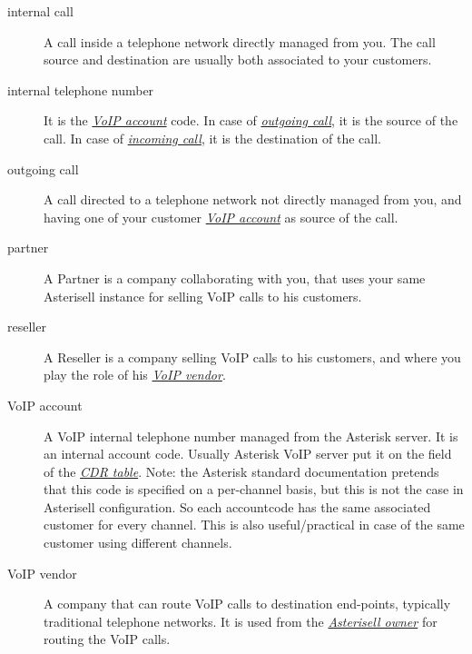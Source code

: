 \documentclass[letterpaper,10pt,english]{sphinxmanual}
\begin{document}
\begin{description}
\item[{internal call}] \leavevmode{}\label{index:term-internal-call}
A call inside a telephone network directly managed from you. The call source and destination are usually both associated to your customers.


\item[{internal telephone number}] \leavevmode{}\label{index:term-internal-telephone-number}
It is the {\hyperref[index:term-voip-account]{\emph{VoIP account}}} code. In case of {\hyperref[index:term-outgoing-call]{\emph{outgoing call}}}, it is the source of the call. In case of {\hyperref[index:term-incoming-call]{\emph{incoming call}}}, it is the destination of the call.


\item[{outgoing call}] \leavevmode{}\label{index:term-outgoing-call}
A call directed to a telephone network not directly managed from you, and having one of your customer {\hyperref[index:term-voip-account]{\emph{VoIP account}}} as source of the call.


\item[{partner}] \leavevmode{}\label{index:term-partner}
A Partner is a company collaborating with you, that uses your same Asterisell instance for selling VoIP calls to his customers.


\item[{reseller}] \leavevmode{}\label{index:term-reseller}
A Reseller is a company selling VoIP calls to his customers, and where you play the role of his {\hyperref[index:term-voip-vendor]{\emph{VoIP vendor}}}.


\item[{VoIP account}] \leavevmode{}\label{index:term-voip-account}
A VoIP internal telephone number managed from the Asterisk server.
It is an internal account code. Usually Asterisk VoIP server put it on the  field of the {\hyperref[index:term-cdr-table]{\emph{CDR table}}}.
Note: the Asterisk standard documentation pretends that this code is specified on a per-channel basis, but this is not the case in Asterisell configuration. So each accountcode has the same associated customer for every channel. This is also useful/practical in case of the same customer using different channels.


\item[{VoIP vendor}] \leavevmode{}\label{index:term-voip-vendor}
A company that can route VoIP calls to destination end-points, typically traditional telephone networks. It is used from the {\hyperref[index:term-asterisell-owner]{\emph{Asterisell owner}}} for routing the VoIP calls.

\end{description}



\renewcommand{\indexname}{Index}
\printindex
\end{document}
